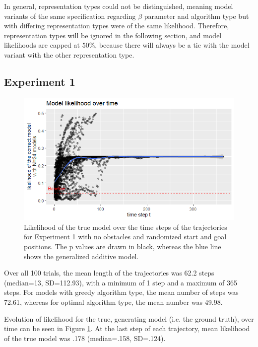 In general, representation types could not be distinguished, meaning model variants of the same specification regarding $\beta$ parameter and algorithm type but with differing representation types were of the same likelihood.
Therefore, representation types will be ignored in the following section, and model likelihoods are capped at $50\%$, because there will always be a tie with the model variant with the other representation type.

\subsection{Experiment 1}
\begin{figure}
	\centering
	\includegraphics[width=0.95\linewidth]{../../statistics/R_noobst_t_likelihoodall}
	\caption{Likelihood of the true model over the time steps of the trajectories for Experiment 1 with no obstacles and randomized start and goal positions. The p values are drawn in black, whereas the blue line shows the generalized additive model.}
	\label{fig:rnoobsttlikelihoodall}
\end{figure}

Over all 100 trials, the mean length of the trajectories was 62.2 steps (median=13, SD=112.93), with a minimum of 1 step and a maximum of 365 steps.
For models with greedy algorithm type, the mean number of steps was 72.61, whereas for optimal algorithm type, the mean number was 49.98.

Evolution of likelihood for the true, generating model (i.e. the ground truth), over time can be seen in Figure \ref{fig:rnoobsttlikelihoodall}. At the last step of each trajectory, mean likelihood of the true model was .178 (median=.158, SD=.124).

